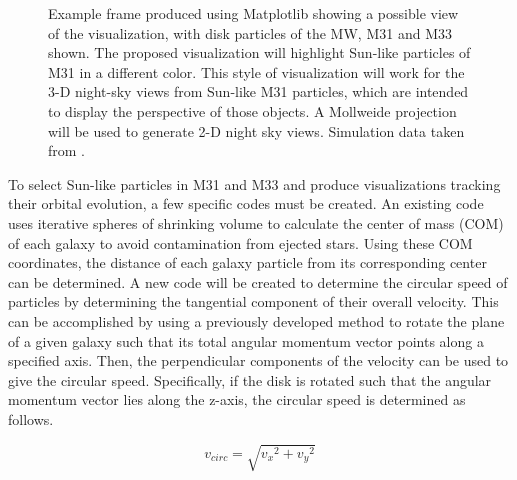 \documentclass[twocolumn]{aastex631}
\begin{document}
\begin{figure}[ht!]
\caption{Example frame produced using Matplotlib showing a possible view of the visualization, with disk particles of the MW, M31 and M33 shown. The proposed visualization will highlight Sun-like particles of M31 in a different color. This style of visualization will work for the 3-D night-sky views from Sun-like M31 particles, which are intended to display the perspective of those objects. A Mollweide projection will be used to generate 2-D night sky views. Simulation data taken from \citet{2012ApJ...753....9V}.
\label{fig2}}
\end{figure}

To select Sun-like particles in M31 and M33 and produce visualizations tracking their orbital evolution, a few specific codes must be created. An existing code uses iterative spheres of shrinking volume to calculate the center of mass (COM) of each galaxy to avoid contamination from ejected stars. Using these COM coordinates, the distance of each galaxy particle from its corresponding center can be determined. A new code will be created to determine the circular speed of particles by determining the tangential component of their overall velocity. This can be accomplished by using a previously developed method to rotate the plane of a given galaxy such that its total angular momentum vector points along a specified axis. Then, the perpendicular components of the velocity can be used to give the circular speed. Specifically, if the disk is rotated such that the angular momentum vector lies along the z-axis, the circular speed is determined as follows.

\begin{equation}
    v_{circ} = \sqrt{{v_x}^2 + {v_y}^2}
\end{equation}
\end{document}
